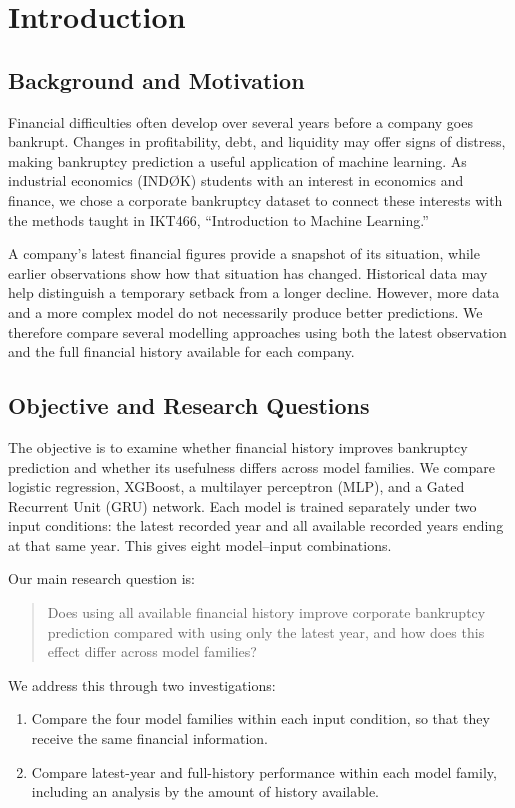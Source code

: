 \chapter{Introduction}

\section{Background and Motivation}
Financial difficulties often develop over several years before a company goes bankrupt. Changes in profitability, debt, and liquidity may offer signs of distress, making bankruptcy prediction a useful application of machine learning. As industrial economics (INDØK) students with an interest in economics and finance, we chose a corporate bankruptcy dataset to connect these interests with the methods taught in IKT466, ``Introduction to Machine Learning.''

A company's latest financial figures provide a snapshot of its situation, while earlier observations show how that situation has changed. Historical data may help distinguish a temporary setback from a longer decline. However, more data and a more complex model do not necessarily produce better predictions. We therefore compare several modelling approaches using both the latest observation and the full financial history available for each company.

\section{Objective and Research Questions}
The objective is to examine whether financial history improves bankruptcy prediction and whether its usefulness differs across model families. We compare logistic regression, XGBoost, a multilayer perceptron (MLP), and a Gated Recurrent Unit (GRU) network. Each model is trained separately under two input conditions: the latest recorded year and all available recorded years ending at that same year. This gives eight model--input combinations.

Our main research question is:
\begin{quote}
Does using all available financial history improve corporate bankruptcy prediction compared with using only the latest year, and how does this effect differ across model families?
\end{quote}

We address this through two investigations:
\begin{enumerate}
    \item Compare the four model families within each input condition, so that they receive the same financial information.
    \item Compare latest-year and full-history performance within each model family, including an analysis by the amount of history available.
\end{enumerate}

